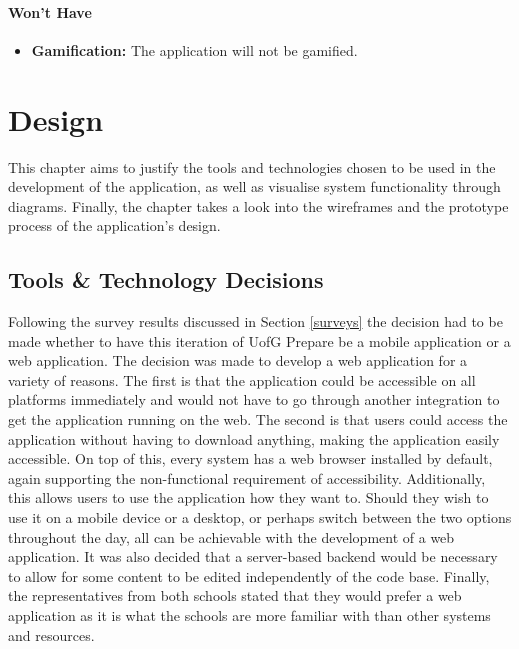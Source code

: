 \documentclass{l4proj}
\begin{document}
\subsubsection{Won't Have}
\begin{itemize}
    \item \textbf{Gamification:} The application will not be gamified.
\end{itemize}

\chapter{Design}
This chapter aims to justify the tools and technologies chosen to be used in the development of the application,  as well as visualise system functionality through diagrams. Finally,  the chapter takes a look into the wireframes and the prototype process of the application's design.

\section{Tools \& Technology Decisions}
Following the survey results discussed in Section \ref{surveys} the decision had to be made whether to have this iteration of UofG Prepare be a mobile application or a web application. The decision was made to develop a web application for a variety of reasons. The first is that the application could be accessible on all platforms immediately and would not have to go through another integration to get the application running on the web. The second is that users could access the application without having to download anything,  making the application easily accessible. On top of this,  every system has a web browser installed by default,  again supporting the non-functional requirement of accessibility. Additionally,  this allows users to use the application how they want to. Should they wish to use it on a mobile device or a desktop,  or perhaps switch between the two options throughout the day,  all can be achievable with the development of a web application. It was also decided that a server-based backend would be necessary to allow for some content to be edited independently of the code base. Finally,  the representatives from both schools stated that they would prefer a web application as it is what the schools are more familiar with than other systems and resources.
\end{document}
